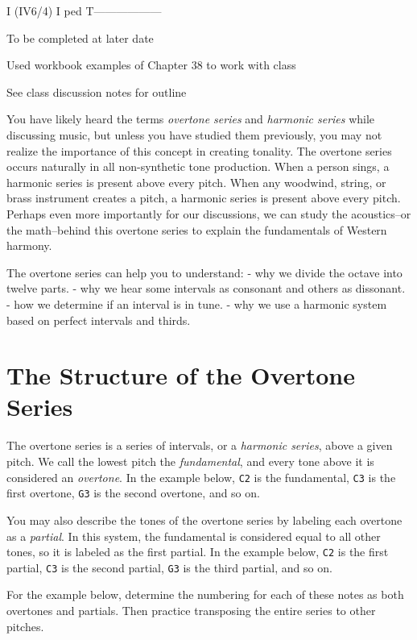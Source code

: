 \documentclass{book}
\begin{document}
I (IV6/4) I ped T------------------

To be completed at later date

Used workbook examples of Chapter 38 to work with class

See class discussion notes for outline

You have likely heard the terms \emph{overtone series} and \emph{harmonic
series} while discussing music, but unless you have studied them previously,
you may not realize the importance of this concept in creating tonality. The
overtone series occurs naturally in all non-synthetic tone production. When a
person sings, a harmonic series is present above every pitch. When any
woodwind, string, or brass instrument creates a pitch, a harmonic series is
present above every pitch. Perhaps even more importantly for our discussions,
we can study the acoustics--or the math--behind this overtone series to
explain the fundamentals of Western harmony.

The overtone series can help you to understand: - why we divide the octave
into twelve parts. - why we hear some intervals as consonant and others as
dissonant. - how we determine if an interval is in tune. - why we use a
harmonic system based on perfect intervals and thirds.

\hypertarget{the-structure-of-the-overtone-series}{%
\section{The Structure of the Overtone
Series}\label{the-structure-of-the-overtone-series}}

The overtone series is a series of intervals, or a \emph{harmonic series},
above a given pitch. We call the lowest pitch the \emph{fundamental}, and
every tone above it is considered an \emph{overtone}. In the example below,
\texttt{C2} is the fundamental, \texttt{C3} is the first overtone, \texttt{G3}
is the second overtone, and so on.

You may also describe the tones of the overtone series by labeling each
overtone as a \emph{partial}. In this system, the fundamental is considered
equal to all other tones, so it is labeled as the first partial. In the
example below, \texttt{C2} is the first partial, \texttt{C3} is the second
partial, \texttt{G3} is the third partial, and so on.

For the example below, determine the numbering for each of these notes as both
overtones and partials. Then practice transposing the entire series to other
pitches.
\end{document}
